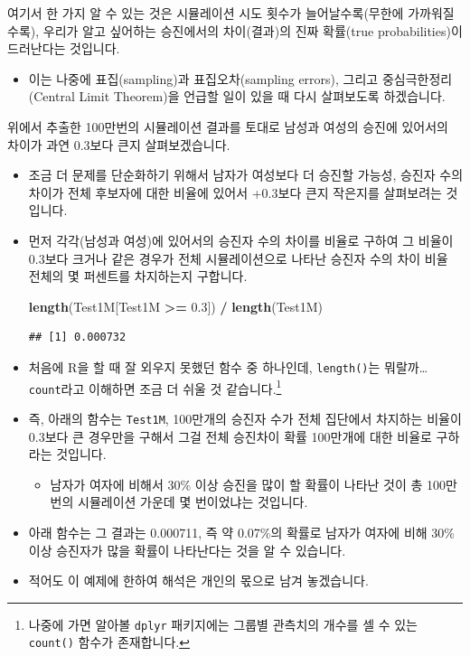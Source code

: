 \documentclass[]{book}
\newenvironment{Shaded}{\begin{snugshade}}{\end{snugshade}}
\newcommand{\FloatTok}[1]{\textcolor[rgb]{0.00,0.00,0.81}{#1}}
\newcommand{\KeywordTok}[1]{\textcolor[rgb]{0.13,0.29,0.53}{\textbf{#1}}}
\newcommand{\NormalTok}[1]{#1}
\newcommand{\OperatorTok}[1]{\textcolor[rgb]{0.81,0.36,0.00}{\textbf{#1}}}
\newcommand{\StringTok}[1]{\textcolor[rgb]{0.31,0.60,0.02}{#1}}
\providecommand{\tightlist}{%
  \setlength{\itemsep}{0pt}\setlength{\parskip}{0pt}}
\let\rmarkdownfootnote\footnote%
\def\footnote{\protect\rmarkdownfootnote}
\begin{document}
여기서 한 가지 알 수 있는 것은 시뮬레이션 시도 횟수가 늘어날수록(무한에 가까워질수록), 우리가 알고 싶어하는 승진에서의 차이(결과)의 진짜 확률(true probabilities)이 드러난다는 것입니다.

\begin{itemize}
\tightlist
\item
  이는 나중에 표집(sampling)과 표집오차(sampling errors), 그리고 중심극한정리(Central Limit Theorem)을 언급할 일이 있을 때 다시 살펴보도록 하겠습니다.
\end{itemize}

위에서 추출한 100만번의 시뮬레이션 결과를 토대로 남성과 여성의 승진에 있어서의 차이가 과연 0.3보다 큰지 살펴보겠습니다.

\begin{itemize}
\item
  조금 더 문제를 단순화하기 위해서 남자가 여성보다 더 승진할 가능성, 승진자 수의 차이가 전체 후보자에 대한 비율에 있어서 +0.3보다 큰지 작은지를 살펴보려는 것입니다.
\item
  먼저 각각(남성과 여성)에 있어서의 승진자 수의 차이를 비율로 구하여 그 비율이 0.3보다 크거나 같은 경우가 전체 시뮬레이션으로 나타난 승진자 수의 차이 비율 전체의 몇 퍼센트를 차지하는지 구합니다.

\begin{Shaded}
\begin{Highlighting}[]
\KeywordTok{length}\NormalTok{(Test1M[Test1M }\OperatorTok{>=}\StringTok{ }\FloatTok{0.3}\NormalTok{]) }\OperatorTok{/}\StringTok{ }\KeywordTok{length}\NormalTok{(Test1M)}
\end{Highlighting}
\end{Shaded}

\begin{verbatim}
## [1] 0.000732
\end{verbatim}
\item
  처음에 R을 할 때 잘 외우지 못했던 함수 중 하나인데, \texttt{length()}는 뭐랄까\ldots{} \texttt{count}라고 이해하면 조금 더 쉬울 것 같습니다.\footnote{나중에 가면 알아볼 \texttt{dplyr} 패키지에는 그룹별 관측치의 개수를 셀 수 있는 \texttt{count()} 함수가 존재합니다.}
\item
  즉, 아래의 함수는 \texttt{Test1M}, 100만개의 승진자 수가 전체 집단에서 차지하는 비율이 0.3보다 큰 경우만을 구해서 그걸 전체 승진차이 확률 100만개에 대한 비율로 구하라는 것입니다.

  \begin{itemize}
  \tightlist
  \item
    남자가 여자에 비해서 30\% 이상 승진을 많이 할 확률이 나타난 것이 총 100만번의 시뮬레이션 가운데 몇 번이었냐는 것입니다.
  \end{itemize}
\item
  아래 함수는 그 결과는 0.000711, 즉 약 0.07\%의 확률로 남자가 여자에 비해 30\% 이상 승진자가 많을 확률이 나타난다는 것을 알 수 있습니다.
\item
  적어도 이 예제에 한하여 해석은 개인의 몫으로 남겨 놓겠습니다.
\end{itemize}
\end{document}
